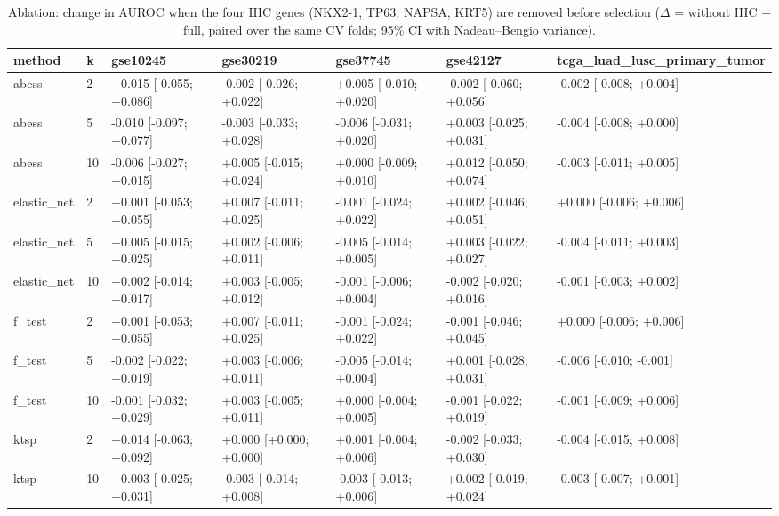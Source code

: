 \begin{table}[t]
  \centering
  \caption{Ablation: change in AUROC when the four IHC genes (NKX2-1, TP63, NAPSA, KRT5) are removed before selection ($\Delta$ = without IHC $-$ full, paired over the same CV folds; 95\% CI with Nadeau--Bengio variance).}
  \label{tab:e1_ablation_ihc}
  \small
  \begin{tabular}{lllllll}
    \toprule
    method & k & gse10245 & gse30219 & gse37745 & gse42127 & tcga\_luad\_lusc\_primary\_tumor \\
    \midrule
    abess & 2 & +0.015 [-0.055; +0.086] & -0.002 [-0.026; +0.022] & +0.005 [-0.010; +0.020] & -0.002 [-0.060; +0.056] & -0.002 [-0.008; +0.004] \\
    abess & 5 & -0.010 [-0.097; +0.077] & -0.003 [-0.033; +0.028] & -0.006 [-0.031; +0.020] & +0.003 [-0.025; +0.031] & -0.004 [-0.008; +0.000] \\
    abess & 10 & -0.006 [-0.027; +0.015] & +0.005 [-0.015; +0.024] & +0.000 [-0.009; +0.010] & +0.012 [-0.050; +0.074] & -0.003 [-0.011; +0.005] \\
    elastic\_net & 2 & +0.001 [-0.053; +0.055] & +0.007 [-0.011; +0.025] & -0.001 [-0.024; +0.022] & +0.002 [-0.046; +0.051] & +0.000 [-0.006; +0.006] \\
    elastic\_net & 5 & +0.005 [-0.015; +0.025] & +0.002 [-0.006; +0.011] & -0.005 [-0.014; +0.005] & +0.003 [-0.022; +0.027] & -0.004 [-0.011; +0.003] \\
    elastic\_net & 10 & +0.002 [-0.014; +0.017] & +0.003 [-0.005; +0.012] & -0.001 [-0.006; +0.004] & -0.002 [-0.020; +0.016] & -0.001 [-0.003; +0.002] \\
    f\_test & 2 & +0.001 [-0.053; +0.055] & +0.007 [-0.011; +0.025] & -0.001 [-0.024; +0.022] & -0.001 [-0.046; +0.045] & +0.000 [-0.006; +0.006] \\
    f\_test & 5 & -0.002 [-0.022; +0.019] & +0.003 [-0.006; +0.011] & -0.005 [-0.014; +0.004] & +0.001 [-0.028; +0.031] & -0.006 [-0.010; -0.001] \\
    f\_test & 10 & -0.001 [-0.032; +0.029] & +0.003 [-0.005; +0.011] & +0.000 [-0.004; +0.005] & -0.001 [-0.022; +0.019] & -0.001 [-0.009; +0.006] \\
    ktsp & 2 & +0.014 [-0.063; +0.092] & +0.000 [+0.000; +0.000] & +0.001 [-0.004; +0.006] & -0.002 [-0.033; +0.030] & -0.004 [-0.015; +0.008] \\
    ktsp & 10 & +0.003 [-0.025; +0.031] & -0.003 [-0.014; +0.008] & -0.003 [-0.013; +0.006] & +0.002 [-0.019; +0.024] & -0.003 [-0.007; +0.001] \\

\end{tabular}
\end{table}
